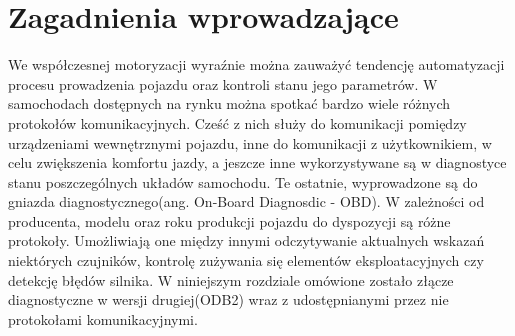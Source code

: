 \documentclass[12pt, twoside]{article} %
\numberwithin{equation}{subsection}
\numberwithin{figure}{section}
\numberwithin{table}{section}
\begin{document}
		\newpage

\section{Zagadnienia wprowadzające}
	\hspace{0.5cm}We współczesnej motoryzacji wyraźnie można zauważyć tendencję automatyzacji procesu prowadzenia pojazdu oraz kontroli stanu jego parametrów. W samochodach dostępnych na rynku można spotkać bardzo wiele różnych protokołów komunikacyjnych. Cześć z nich służy do komunikacji pomiędzy urządzeniami wewnętrznymi pojazdu, inne do komunikacji z użytkownikiem, w celu zwiększenia komfortu jazdy, a jeszcze inne wykorzystywane są w diagnostyce stanu poszczególnych układów samochodu. Te ostatnie, wyprowadzone są do gniazda diagnostycznego(ang. On-Board Diagnosdic - OBD). W zależności od producenta, modelu oraz roku produkcji pojazdu do dyspozycji są różne protokoły. Umożliwiają one między innymi odczytywanie aktualnych wskazań niektórych czujników, kontrolę zużywania się elementów eksploatacyjnych czy detekcję błędów silnika. W niniejszym rozdziale omówione zostało złącze diagnostyczne w wersji drugiej(ODB2) wraz z udostępnianymi przez nie protokołami komunikacyjnymi.
\end{document}
